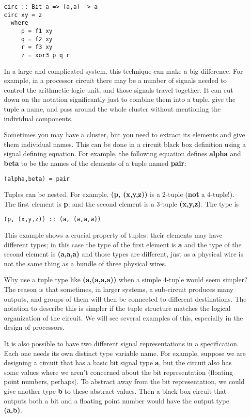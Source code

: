 \documentclass[11pt]{article}
\begin{document}
\begin{verbatim}
circ :: Bit a => (a,a) -> a
circ xy = z
  where
     p = f1 xy
     q = f2 xy
     r = f3 xy
     z = xor3 p q r
\end{verbatim}

In a large and complicated system, this technique can make a big
difference.  For example, in a processor circuit there may be a number
of signals needed to control the arithmetic-logic unit, and those
signals travel together.  It can cut down on the notation
significantly just to combine them into a tuple, give the tuple a
name, and pass around the whole cluster without mentioning the
individual components.

Sometimes you may have a cluster, but you need to extract its elements
and give them individual names.  This can be done in a circuit black
box definition using a signal defining equation.  For example, the
following equation defines \textbf{alpha} and \textbf{beta} to be the names of the
elements of a tuple named \textbf{pair}:

\begin{verbatim}
(alpha,beta) = pair
\end{verbatim}

Tuples can be nested.  For example, \textbf{(p, (x,y,z))} is a 2-tuple
(\textbf{not} a 4-tuple!).  The first element is \textbf{p}, and the second
element is a 3-tuple \textbf{(x,y,z)}.  The type is


\begin{verbatim}
(p, (x,y,z)) :: (a, (a,a,a))
\end{verbatim}

This example shows a crucial property of tuples: their elements may
have different types; in this case the type of the first element is
\textbf{a} and the type of the second element is \textbf{(a,a,a)} and those types
are different, just as a physical wire is not the same thing as a
bundle of three physical wires.

Why use a tuple type like \textbf{(a,(a,a,a))} when a simple 4-tuple would
seem simpler?  The reason is that sometimes, in larger systems, a
sub-circuit produces many outputs, and groups of them will then be
connected to different destinations.  The notation to describe this is
simpler if the tuple structure matches the logical organization of the
circuit.  We will see several examples of this, especially in the
design of processors.

It is also possible to have two different signal representations in a
specification.  Each one needs its own distinct type variable name.
For example, suppose we are designing a circuit that has a basic bit
signal type \textbf{a}, but the circuit also has some values where we aren't
concerned about the bit representation (floating point numbers,
perhaps).  To abstract away from the bit representation, we could give
another type \textbf{b} to these abstract values.  Then a black box circuit
that outputs both a bit and a floating point number would have the
output type \textbf{(a,b)}.
\end{document}
